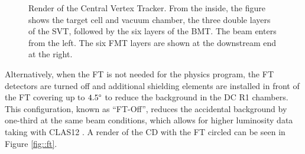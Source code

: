     \begin{figure}
        \centering{}
        \caption[CVT]{Render of the Central Vertex Tracker.
        From the inside, the figure shows the target cell and vacuum chamber, the three double layers of the SVT, followed by the six layers of the BMT.
        The beam enters from the left.
        The six FMT layers are shown at the downstream end at the right.}
        \label{fig::cvt}
    \end{figure}

    Alternatively, when the FT is not needed for the physics program, the FT detectors are turned off and additional shielding elements are installed in front of the FT covering up to $4.5\degree$ to reduce the background in the DC R1 chambers.
    This configuration, known as ``FT-Off'', reduces the accidental background by one-third at the same beam conditions, which allows for higher luminosity data taking with CLAS12 \cite{acker2020ft}.
    A render of the CD with the FT circled can be seen in Figure \ref{fig::ft}.
